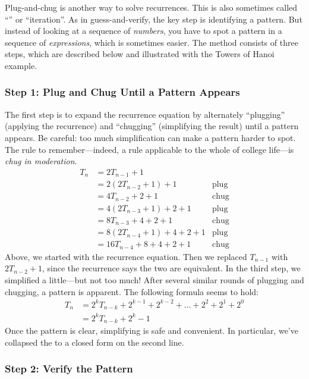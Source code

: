 Plug-and-chug is another way to solve recurrences.  This is also
sometimes called ``'' or ``iteration''.  As in
guess-and-verify, the key step is identifying a pattern.  But instead
of looking at a sequence of \emph{numbers}, you have to spot a pattern
in a sequence of \emph{expressions}, which is sometimes easier.  The
method consists of three steps, which are described below and
illustrated with the Towers of Hanoi example.

\subsubsection*{Step 1: Plug and Chug Until a Pattern Appears}

The first step is to expand the recurrence equation by alternately
``plugging'' (applying the recurrence) and ``chugging'' (simplifying the
result) until a pattern appears.  Be careful: too much simplification
can make a pattern harder to spot.  The rule to remember---indeed, a
rule applicable to the whole of college life---is \emph{chug in
  moderation}.
\begin{align*}
T_n & = 2T_{n-1} + 1 \\
  & = 2 (2 T_{n-2} + 1)  + 1 & \text{plug} \\
  & = 4 T_{n-2} + 2 + 1 & \text{chug} \\
  & = 4 (2 T_{n-3} + 1) + 2 + 1 & \text{plug} \\
  & = 8 T_{n-3} + 4 + 2 + 1 & \text{chug} \\
  & = 8 (2 T_{n-4} + 1) + 4 + 2 + 1 & \text{plug} \\
  & = 16 T_{n-4} + 8 + 4 + 2 + 1 & \text{chug}
\end{align*}
Above, we started with the recurrence equation.  Then we replaced
$T_{n-1}$ with $2 T_{n-2} + 1$, since the recurrence says the two are
equivalent.  In the third step, we simplified a little---but not too
much!  After several similar rounds of plugging and chugging, a
pattern is apparent.  The following formula seems to hold:
\begin{align*}
T_n & = 2^k T_{n - k} + 2^{k-1} + 2^{k-2} + \ldots + 2^2 + 2^1 + 2^0 \\
   & = 2^k T_{n-k} + 2^k - 1
\end{align*}
Once the pattern is clear, simplifying is safe and convenient.  In
particular, we've collapsed the  to a closed form on the
second line.

\subsubsection*{Step 2:  Verify the Pattern}


